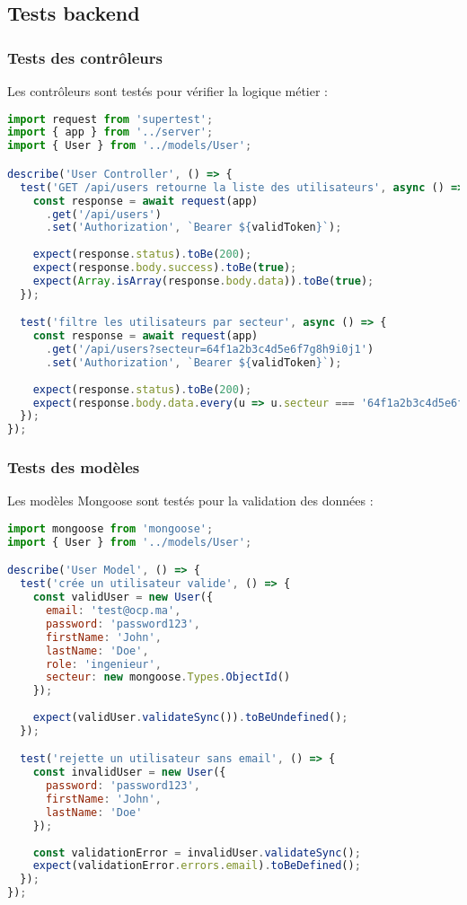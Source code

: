 \subsection{Tests backend}
\subsubsection{Tests des contrôleurs}
Les contrôleurs sont testés pour vérifier la logique métier :

\begin{lstlisting}[language=JavaScript, caption=Test d'un contrôleur backend]
import request from 'supertest';
import { app } from '../server';
import { User } from '../models/User';

describe('User Controller', () => {
  test('GET /api/users retourne la liste des utilisateurs', async () => {
    const response = await request(app)
      .get('/api/users')
      .set('Authorization', `Bearer ${validToken}`);
    
    expect(response.status).toBe(200);
    expect(response.body.success).toBe(true);
    expect(Array.isArray(response.body.data)).toBe(true);
  });

  test('filtre les utilisateurs par secteur', async () => {
    const response = await request(app)
      .get('/api/users?secteur=64f1a2b3c4d5e6f7g8h9i0j1')
      .set('Authorization', `Bearer ${validToken}`);
    
    expect(response.status).toBe(200);
    expect(response.body.data.every(u => u.secteur === '64f1a2b3c4d5e6f7g8h9i0j1')).toBe(true);
  });
});
\end{lstlisting}

\subsubsection{Tests des modèles}
Les modèles Mongoose sont testés pour la validation des données :

\begin{lstlisting}[language=JavaScript, caption=Test d'un modèle Mongoose]
import mongoose from 'mongoose';
import { User } from '../models/User';

describe('User Model', () => {
  test('crée un utilisateur valide', () => {
    const validUser = new User({
      email: 'test@ocp.ma',
      password: 'password123',
      firstName: 'John',
      lastName: 'Doe',
      role: 'ingenieur',
      secteur: new mongoose.Types.ObjectId()
    });
    
    expect(validUser.validateSync()).toBeUndefined();
  });

  test('rejette un utilisateur sans email', () => {
    const invalidUser = new User({
      password: 'password123',
      firstName: 'John',
      lastName: 'Doe'
    });
    
    const validationError = invalidUser.validateSync();
    expect(validationError.errors.email).toBeDefined();
  });
});
\end{lstlisting}

